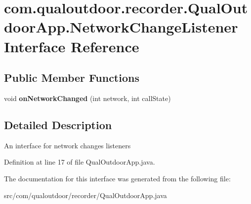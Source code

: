\hypertarget{interfacecom_1_1qualoutdoor_1_1recorder_1_1QualOutdoorApp_1_1NetworkChangeListener}{\section{com.\-qualoutdoor.\-recorder.\-Qual\-Outdoor\-App.\-Network\-Change\-Listener Interface Reference}
\label{interfacecom_1_1qualoutdoor_1_1recorder_1_1QualOutdoorApp_1_1NetworkChangeListener}
}
\subsection*{Public Member Functions}
\begin{DoxyCompactItemize}
\item 
\hypertarget{interfacecom_1_1qualoutdoor_1_1recorder_1_1QualOutdoorApp_1_1NetworkChangeListener_a9c52b2774b1c63474c5eed3ce703e168}{void {\bfseries on\-Network\-Changed} (int network, int call\-State)}\label{interfacecom_1_1qualoutdoor_1_1recorder_1_1QualOutdoorApp_1_1NetworkChangeListener_a9c52b2774b1c63474c5eed3ce703e168}

\end{DoxyCompactItemize}


\subsection{Detailed Description}
An interface for network changes listeners 

Definition at line 17 of file Qual\-Outdoor\-App.\-java.



The documentation for this interface was generated from the following file\-:\begin{DoxyCompactItemize}
\item 
src/com/qualoutdoor/recorder/Qual\-Outdoor\-App.\-java\end{DoxyCompactItemize}

